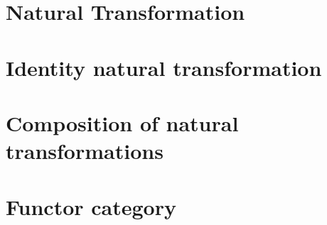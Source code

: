 \section{Natural Transformation}
    
\section{Identity natural transformation}
    
\section{Composition of natural transformations}
    
\section{Functor category}
    
